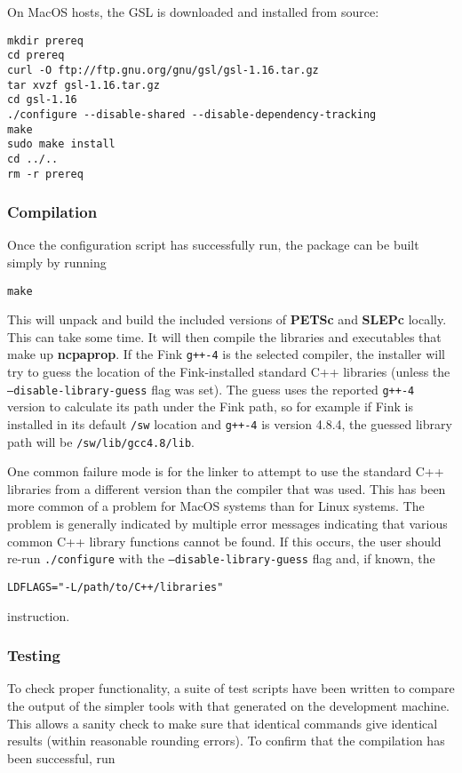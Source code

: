 \noindent
On MacOS hosts, the GSL is downloaded and installed from source:

\begin{verbatim}
mkdir prereq
cd prereq
curl -O ftp://ftp.gnu.org/gnu/gsl/gsl-1.16.tar.gz
tar xvzf gsl-1.16.tar.gz
cd gsl-1.16
./configure --disable-shared --disable-dependency-tracking
make
sudo make install
cd ../..
rm -r prereq
\end{verbatim}

\subsubsection{Compilation}

Once the configuration script has successfully run, the package can be built simply by running

\texttt{make}

\noindent
This will unpack and build the included versions of \textbf{PETSc} and \textbf{SLEPc} locally. This can take some time. It will then compile the libraries and executables that make up \textbf{ncpaprop}.  If the Fink \texttt{g++-4} is the selected compiler, the installer will try to guess the location of the Fink-installed standard C++ libraries (unless the \texttt{--disable-library-guess} flag was set).  The guess uses the reported \texttt{g++-4} version to calculate its path under the Fink path, so for example if Fink is installed in its default \texttt{/sw} location and \texttt{g++-4} is version 4.8.4, the guessed library path will be \texttt{/sw/lib/gcc4.8/lib}.

One common failure mode is for the linker to attempt to use the standard C++ libraries from a different version than the compiler that was used.  This has been more common of a problem for MacOS systems than for Linux systems.  The problem is generally indicated by multiple error messages indicating that various common C++ library functions cannot be found. If this occurs, the user should re-run \texttt{./configure} with the \texttt{--disable-library-guess} flag and, if known, the 

\texttt{LDFLAGS="-L/path/to/C++/libraries"} 

\noindent
instruction.

\subsubsection{Testing}

To check proper functionality, a suite of test scripts have been written to compare the output of the simpler tools with that generated on the development machine.  This allows a sanity check to make sure that identical commands give identical results (within reasonable rounding errors).  To confirm that the compilation has been successful, run

